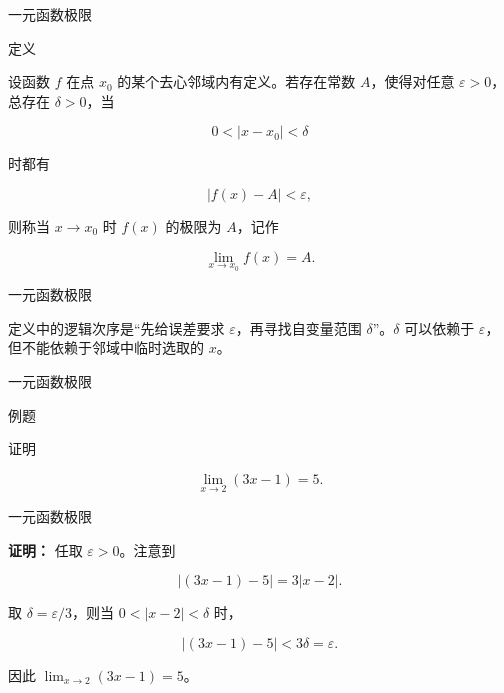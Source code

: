 \documentclass[aspectratio=169,10pt,fontset=fandol]{ctexbeamer}
\begin{document}
\begin{frame}[t,fragile]{一元函数极限}
\normalsize
\begin{block}{定义}
{\normalsize


设函数 \(f\) 在点 \(x_0\) 的某个去心邻域内有定义。若存在常数 \(A\)，使得对任意 \(\varepsilon>0\)，总存在 \(\delta>0\)，当

\[

0<|x-x_0|<\delta

\]

时都有

\[

|f(x)-A|<\varepsilon,

\]

则称当 \(x\to x_0\) 时 \(f(x)\) 的极限为 \(A\)，记作

\[

\lim_{x\to x_0}f(x)=A.

\]


}
\end{block}
\end{frame}
\begin{frame}[t,fragile]{一元函数极限}
\normalsize
{\normalsize




定义中的逻辑次序是“先给误差要求 \(\varepsilon\)，再寻找自变量范围 \(\delta\)”。\(\delta\) 可以依赖于 \(\varepsilon\)，但不能依赖于邻域中临时选取的 \(x\)。




}
\end{frame}
\begin{frame}[t,fragile]{一元函数极限}
\normalsize
\begin{block}{例题}
{\normalsize


证明

\[

\lim_{x\to2}(3x-1)=5.

\]


}
\end{block}
\end{frame}
\begin{frame}[t,fragile]{一元函数极限}
\normalsize
{\normalsize
\textbf{证明：}
任取 \(\varepsilon>0\)。注意到

\[

|(3x-1)-5|=3|x-2|.

\]

取 \(\delta=\varepsilon/3\)，则当 \(0<|x-2|<\delta\) 时，

\[

|(3x-1)-5|<3\delta=\varepsilon.

\]

因此 \(\lim_{x\to2}(3x-1)=5\)。


}
\end{frame}
\end{document}
